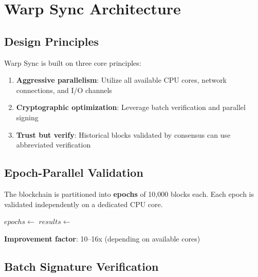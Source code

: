 \documentclass[11pt,a4paper]{article}
\begin{document}
\section{Warp Sync Architecture}

\subsection{Design Principles}

Warp Sync is built on three core principles:

\begin{enumerate}
    \item \textbf{Aggressive parallelism}: Utilize all available CPU cores, network connections, and I/O channels
    \item \textbf{Cryptographic optimization}: Leverage batch verification and parallel signing
    \item \textbf{Trust but verify}: Historical blocks validated by consensus can use abbreviated verification
\end{enumerate}

\subsection{Epoch-Parallel Validation}

The blockchain is partitioned into \textbf{epochs} of 10,000 blocks each. Each epoch is validated independently on a dedicated CPU core.

\begin{algorithm}
\caption{Epoch-Parallel Validation}
\begin{algorithmic}[1]
    \State $epochs \gets$ 
    \State $results \gets$ 
    \State \Return {}
\EndProcedure
{}
        \State {}
        \State {}
            \State {}
        \EndIf
    \EndFor
\EndProcedure
\end{algorithmic}
\end{algorithm}

\textbf{Improvement factor}: 10--16x (depending on available cores)

\subsection{Batch Signature Verification}
\end{document}
